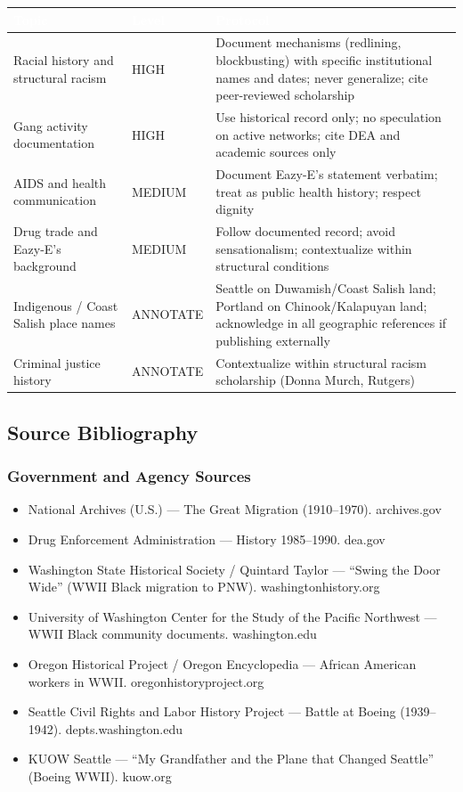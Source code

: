 \documentclass[11pt,letterpaper]{article}
\newcommand{\tableheader}[1]{\textbf{\sffamily\textcolor{white}{#1}}}
\begin{document}
\begin{center}
\begin{tabularx}{\textwidth}{L{3.5cm}L{2cm}X}
\toprule
{}
\tableheader{Topic} & \tableheader{Level} & \tableheader{Protocol} \\
\midrule
Racial history and structural racism & HIGH & Document mechanisms (redlining, blockbusting) with specific institutional names and dates; never generalize; cite peer-reviewed scholarship \\
Gang activity documentation & HIGH & Use historical record only; no speculation on active networks; cite DEA and academic sources only \\
AIDS and health communication & MEDIUM & Document Eazy-E's statement verbatim; treat as public health history; respect dignity \\
Drug trade and Eazy-E's background & MEDIUM & Follow documented record; avoid sensationalism; contextualize within structural conditions \\
Indigenous / Coast Salish place names & ANNOTATE & Seattle on Duwamish/Coast Salish land; Portland on Chinook/Kalapuyan land; acknowledge in all geographic references if publishing externally \\
Criminal justice history & ANNOTATE & Contextualize within structural racism scholarship (Donna Murch, Rutgers) \\
\bottomrule
\end{tabularx}
\end{center}

\subsection{Source Bibliography}

\subsubsection{Government and Agency Sources}

\begin{itemize}[leftmargin=1.5em]
  \item National Archives (U.S.) --- The Great Migration (1910--1970). archives.gov
  \item Drug Enforcement Administration --- History 1985--1990. dea.gov
  \item Washington State Historical Society / Quintard Taylor --- ``Swing the Door Wide'' (WWII Black migration to PNW). washingtonhistory.org
  \item University of Washington Center for the Study of the Pacific Northwest --- WWII Black community documents. washington.edu
  \item Oregon Historical Project / Oregon Encyclopedia --- African American workers in WWII. oregonhistoryproject.org
  \item Seattle Civil Rights and Labor History Project --- Battle at Boeing (1939--1942). depts.washington.edu
  \item KUOW Seattle --- ``My Grandfather and the Plane that Changed Seattle'' (Boeing WWII). kuow.org
\end{itemize}
\end{document}
